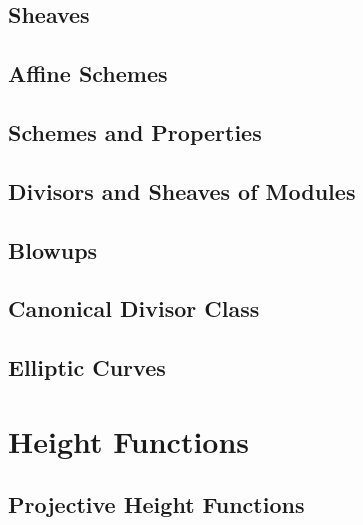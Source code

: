 \documentclass[12pt, leqno]{article}
\begin{document}
\subsection{Sheaves}
\let\clearpage\relax

\subsection{Affine Schemes}
\let\clearpage\relax

\subsection{Schemes and Properties}
\let\clearpage\relax

\subsection{Divisors and Sheaves of Modules}
\let\clearpage\relax

\subsection{Blowups}
\let\clearpage\relax

\subsection{Canonical Divisor Class}
\let\clearpage\relax

\subsection{Elliptic Curves}
\let\clearpage\relax

\newpage
\section{Height Functions}

\subsection{Projective Height Functions}
\let\clearpage\relax
\end{document}
